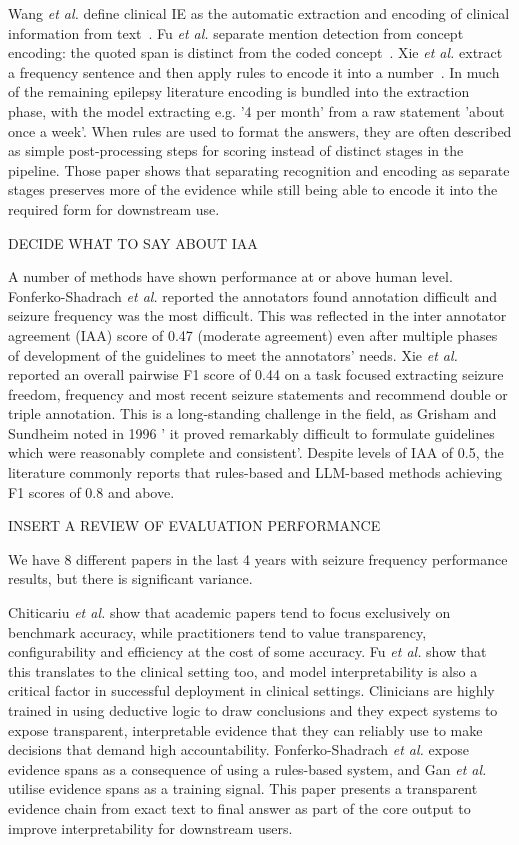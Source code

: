 \documentclass[conference]{IEEEtran}
\begin{document}
Wang \emph{et al.} define clinical IE as the automatic 
extraction and encoding of clinical information from 
text~\cite{b8}. Fu \emph{et al.} separate mention detection 
from concept encoding: the quoted span is distinct from
the coded concept~\cite{b6}. Xie \emph{et al.} extract a frequency 
sentence and then apply rules to encode it into a number~\cite{b9}. 
In much of the remaining epilepsy literature encoding is 
bundled into the extraction phase, with the model 
extracting e.g. '4 per month' from a raw statement 'about once 
a week'. When rules are used to format the answers, they are 
often described as simple post-processing steps for scoring 
instead of distinct stages in the pipeline. Those paper shows 
that separating recognition and encoding as separate stages 
preserves more of the evidence while still being able to 
encode it into the required form for downstream use.

DECIDE WHAT TO SAY ABOUT IAA

A number of methods have shown performance at 
or above human level. Fonferko-Shadrach \emph{et al.} 
reported the annotators found annotation difficult 
and seizure frequency was the most difficult. This was 
reflected in the inter annotator agreement (IAA) score
of 0.47 (moderate agreement) even after multiple phases 
of development of the guidelines to meet the annotators' 
needs.  Xie \emph{et al.} reported an overall pairwise F1
score of 0.44 on a task focused extracting seizure 
freedom, frequency and most recent seizure
statements and recommend double or triple annotation. 
This is a long-standing challenge in the field, as Grisham 
and Sundheim noted in 1996 ' it proved remarkably difficult
to formulate guidelines which were reasonably complete 
and consistent'. Despite levels of IAA of 0.5, the literature 
commonly reports that rules-based and LLM-based 
methods achieving F1 scores of 0.8 and above. 

INSERT A REVIEW OF EVALUATION PERFORMANCE

We have 8 different papers in the last 4 years with seizure frequency
performance results, but there is significant variance. 

Chiticariu \emph{et al.} show that academic papers tend to focus 
exclusively on benchmark accuracy, while practitioners tend 
to value transparency, configurability and efficiency at the 
cost of some accuracy. Fu \emph{et al.} show that this 
translates to the clinical setting too, and model interpretability 
is also a critical factor in successful deployment in clinical 
settings. Clinicians are highly trained in using deductive 
logic to draw conclusions and they expect systems to 
expose transparent, interpretable evidence that they can  
reliably use to make decisions that demand high 
accountability. Fonferko-Shadrach \emph{et al.} expose 
evidence spans as a consequence of using a rules-based 
system, and Gan \emph{et al.} utilise evidence spans as a 
training signal. This paper presents a transparent evidence 
chain from exact text to final answer as part of the core 
output to improve interpretability for downstream users.
\end{document}
